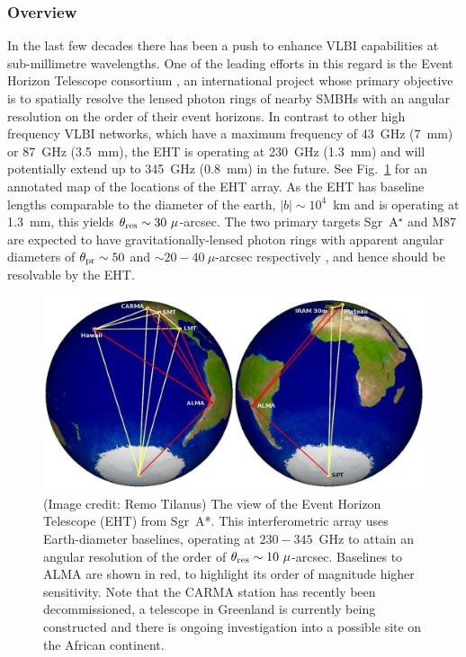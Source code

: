 \subsubsection{Overview}
In the last few decades there has been a push to enhance VLBI capabilities at sub-millimetre wavelengths. One of the leading efforts in this regard is the Event Horizon Telescope consortium \citep[(EHT),][]{Doeleman_2010}, an international project whose primary objective is to spatially resolve the lensed photon rings of nearby SMBHs with an angular resolution on the order of their event horizons. In contrast to other high frequency VLBI networks, which have a maximum frequency of 43~GHz (7~mm) or 87~GHz (3.5~mm), the EHT is operating at 230~GHz (1.3~mm) and will potentially extend up to 345~GHz (0.8~mm) in the future. See Fig.~\ref{fig:eht_globe} for an annotated map of the locations of the EHT array. As the EHT has baseline lengths comparable to the diameter of the earth, $|b| \sim 10^4$~km and is operating at 1.3~mm, this yields $\theta_{\rm res} \sim 30\ \mu$-arcsec.  The two primary targets Sgr~A$^\star$ and M87 are expected to have gravitationally-lensed photon rings with apparent angular diameters of $\theta_{\rm pr} \sim 50$ and $\sim 20-40\ \mu$-arcsec respectively \citep*{Falcke_2013, Broderick_2009}, and hence should be resolvable by the EHT. 

\begin{figure}[h!]
\includegraphics[width=0.8\columnwidth]{Images/eht_globe}
\caption[The view of the Event Horizon Telescope (EHT) from Sgr~A*.]{(Image credit: Remo Tilanus) The view of the Event Horizon Telescope (EHT) from Sgr~A*. This interferometric array uses Earth-diameter baselines, operating at $230-345$~GHz to attain an angular resolution of the order of ${\theta_{\rm res} \sim 10\ \mu}$-arcsec. Baselines to ALMA are shown in red, to highlight its order of magnitude higher sensitivity. Note that the CARMA station has recently been decommissioned, a telescope in Greenland is currently being constructed and there is ongoing investigation into a possible site on the African continent.\label{fig:eht_globe}%
}
\end{figure}




